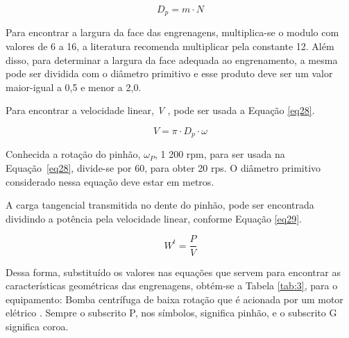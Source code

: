 \documentclass[12pt,a4paper]{article}
\begin{document}
\par\null

\begin{equation}
\label{eq27}
D_p=m \cdot N
\end{equation}

\par\null

Para encontrar a largura da face das engrenagens, multiplica-se o modulo
com valores de 6 a 16, a literatura recomenda multiplicar pela constante
12. Além disso, para determinar a largura da face adequada ao
engrenamento, a mesma pode ser dividida com o diâmetro primitivo e esse
produto deve ser um valor maior-igual a 0,5 e menor a 2,0.

Para encontrar a velocidade linear, \emph{V} , pode ser usada a Equação
{\ref{eq28}}.

\par\null

\begin{equation}
\label{eq28}
V=\pi \cdot D_p\cdot \omega
\end{equation}

\par\null

Conhecida a rotação do pinhão, $\omega_P$, 1 200 rpm,
para ser usada na Equação~{\ref{eq28}}, divide-se por
60, para obter 20 rps. O diâmetro primitivo considerado nessa equação
deve estar em metros.

A carga tangencial transmitida no dente do pinhão, pode ser encontrada
dividindo a potência pela velocidade linear, conforme Equação
{\ref{eq29}}.

\par\null

\begin{equation}
\label{eq29}
W^t=\frac{P}{V}
\end{equation}

\par\null

Dessa forma, substituído os valores nas equações que servem para
encontrar as características geométricas das engrenagens, obtém-se a
Tabela {\ref{tab:3}}, para o equipamento: Bomba
centrífuga de baixa rotação que é acionada por um motor elétrico .
Sempre o subscrito P, nos símbolos, significa pinhão, e o subscrito G
significa coroa.
\end{document}
